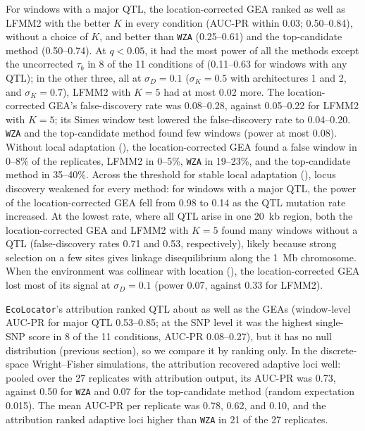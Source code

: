 \documentclass[]{article}
\newcommand{\ecolocator}{\texttt{EcoLocator}\xspace}
\begin{document}
For windows with a major QTL,
the location-corrected GEA ranked as well as LFMM2 with the better $K$
in every condition (AUC-PR within 0.03; 0.50--0.84),
without a choice of $K$,
and better than \texttt{WZA} (0.25--0.61)
and the top-candidate method (0.50--0.74).
At $q < 0.05$, it had the most power of all the methods
except the uncorrected $\tau_b$
in 8 of the 11 conditions of 
(0.11--0.63 for windows with any QTL);
in the other three, all at $\sigma_D = 0.1$
($\sigma_K = 0.5$ with architectures 1 and 2, and $\sigma_K = 0.7$),
LFMM2 with $K = 5$ had at most 0.02 more.
The location-corrected GEA's false-discovery rate was 0.08--0.28,
against 0.05--0.22 for LFMM2 with $K = 5$;
its Simes window test lowered the false-discovery rate to 0.04--0.20.
\texttt{WZA} and the top-candidate method found few windows
(power at most 0.08).
Without local adaptation (),
the location-corrected GEA found a false window in 0--8\% of the replicates,
LFMM2 in 0--5\%,
\texttt{WZA} in 19--23\%,
and the top-candidate method in 35--40\%.
Across the threshold for stable local adaptation (),
locus discovery weakened for every method:
for windows with a major QTL,
the power of the location-corrected GEA fell from 0.98 to 0.14
as the QTL mutation rate increased.
At the lowest rate, where all QTL arise in one 20~kb region,
both the location-corrected GEA and LFMM2 with $K = 5$ found many windows without a QTL
(false-discovery rates 0.71 and 0.53, respectively),
likely because strong selection on a few sites
gives linkage disequilibrium along the 1~Mb chromosome.
When the environment was collinear with location (),
the location-corrected GEA lost most of its signal at $\sigma_D = 0.1$
(power 0.07, against 0.33 for LFMM2).

\ecolocator's attribution ranked QTL about as well as the GEAs
(window-level AUC-PR for major QTL 0.53--0.85;
at the SNP level it was the highest single-SNP score
in 8 of the 11 conditions, AUC-PR 0.08--0.27),
but it has no null distribution (previous section),
so we compare it by ranking only.
In the discrete-space Wright--Fisher simulations,
the attribution recovered adaptive loci well:
pooled over the 27 replicates with attribution output,
its AUC-PR was 0.73,
against 0.50 for \texttt{WZA}
and 0.07 for the top-candidate method
(random expectation 0.015).
The mean AUC-PR per replicate was 0.78, 0.62, and 0.10,
and the attribution ranked adaptive loci higher than \texttt{WZA}
in 21 of the 27 replicates.
\end{document}
